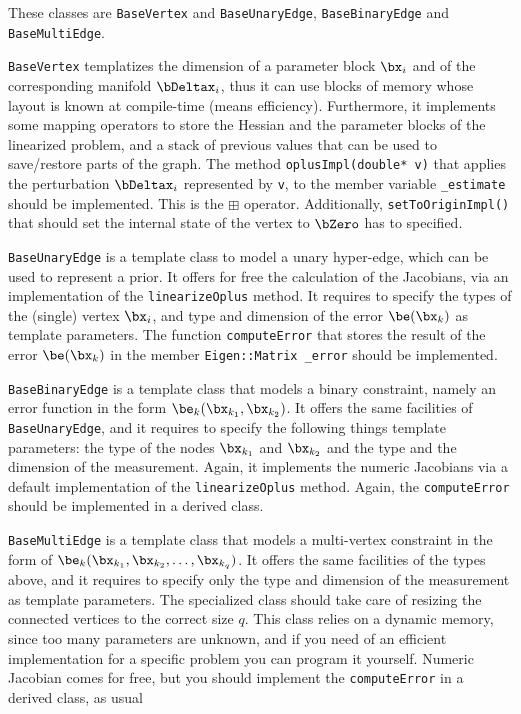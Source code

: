 \documentclass[a4paper]{article}
\begin{document}
These classes are \verb+BaseVertex+ and \verb+BaseUnaryEdge+,
\verb+BaseBinaryEdge+ and \verb+BaseMultiEdge+. 
\begin{description}
\item \verb+BaseVertex+ templatizes the dimension of a parameter block
  $\bx_i$ and of the corresponding manifold $\bDeltax_i$, thus it can 
  use blocks of memory whose layout is known at compile-time (means
  efficiency). Furthermore, it implements some mapping operators to
  store the Hessian and the parameter blocks of the linearized
  problem, and a stack of previous values that can be used to
  save/restore parts of the graph.  The method \verb+oplusImpl(double* v)+
  that applies the perturbation $\bDeltax_i$ represented by \verb+v+,
  to the member variable \verb+_estimate+ should be implemented. This
  is the $\boxplus$ operator. Additionally,
  \verb+setToOriginImpl()+ that should set the internal state of the vertex
  to $\bZero$ has to specified.

\item \verb+BaseUnaryEdge+ is a template class to model a unary
  hyper-edge, which can be used to represent a prior. It offers for
  free the calculation of the Jacobians, via an implementation of the
  \verb+linearizeOplus+ method. It requires to specify the types of
  the (single) vertex $\bx_i$, and type and dimension of the error 
  $\be(\bx_k)$ as template parameters.  The function
  \verb+computeError+ that stores the result of the error $\be(\bx_k)$ in the
  member \verb+Eigen::Matrix _error+ should be implemented.

\item \verb+BaseBinaryEdge+ is a template class that models a binary
  constraint, namely an error function in the form $\be_k(\bx_{k_1},
  \bx_{k_2})$. It offers the same facilities of \verb+BaseUnaryEdge+, and it
  requires to specify the following things template parameters: the type of the nodes
  $\bx_{k_1}$ and $\bx_{k_2}$  and the  type and the dimension of the measurement. 
  Again, it implements the numeric Jacobians via
  a default implementation of the \verb+linearizeOplus+ method.
  Again, the \verb+computeError+ should be implemented in a derived class.

\item \verb+BaseMultiEdge+ is a template class that models a
  multi-vertex constraint in the form of $\be_k(\bx_{k_1}, \bx_{k_2},
  \ldots, \bx_{k_q})$. It offers the same facilities of the types
  above, and it requires to specify only the type and dimension of the
  measurement as template parameters. The specialized class should
  take care of resizing the connected vertices to the correct size
  $q$.  This class relies on a dynamic memory, since too many
  parameters are unknown, and if you need of an efficient
  implementation for a specific problem you can program it yourself.
  Numeric Jacobian comes for free, but you should implement the
  \verb+computeError+ in a derived class, as usual
\end{description}
\end{document}
